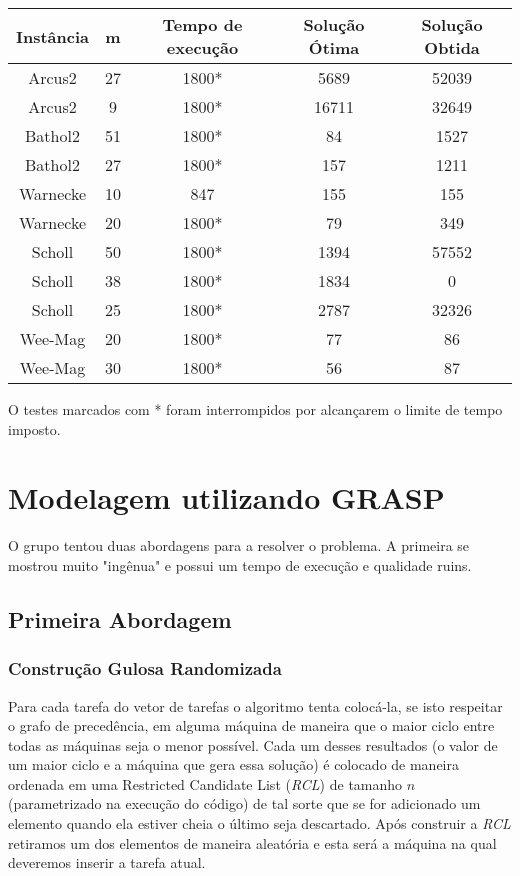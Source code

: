 \documentclass{report}
\begin{document}
\begin{table}[htbp]
 \begin{tabular}{|c|c|c|c|c|}
  \hline
  \textbf{Instância} & \textbf{m} & \textbf{Tempo de execução} & \textbf{Solução Ótima} & \textbf{Solução Obtida} \\
  \hline
  Arcus2 & 27 & 1800* & 5689  & 52039 \\
  \hline
  Arcus2 & 9 & 1800* & 16711 & 32649 \\
  \hline
  Bathol2 & 51 & 1800* & 84 & 1527 \\
  \hline
  Bathol2 & 27 & 1800* & 157 & 1211 \\
  \hline
  Warnecke & 10 & 847 & 155 & 155 \\
  \hline
  Warnecke & 20 & 1800* & 79 & 349 \\
  \hline
  Scholl & 50 & 1800* & 1394 & 57552 \\
  \hline
  Scholl & 38 & 1800* & 1834 & 0 \\
  \hline
  Scholl & 25 & 1800* & 2787 & 32326 \\
  \hline
  Wee-Mag & 20 & 1800* & 77 & 86 \\
  \hline
  Wee-Mag & 30 & 1800* & 56 & 87 \\
  \hline
 \end{tabular}
\end{table}

O testes marcados com * foram interrompidos por alcançarem o limite de tempo imposto.



\chapter{Modelagem utilizando GRASP}

O grupo tentou duas abordagens para a resolver o problema. A primeira se
mostrou muito "ingênua" e possui um tempo de execução e qualidade ruins.

\section{Primeira Abordagem}

\subsection{Construção Gulosa Randomizada}

Para cada tarefa do vetor de tarefas o algoritmo tenta colocá-la, se
isto respeitar o grafo de precedência, em alguma
máquina de maneira que o maior ciclo entre todas as máquinas
seja o menor possível. Cada um desses resultados (o valor de um maior ciclo e
a máquina que gera essa solução)
é colocado de maneira ordenada em uma Restricted Candidate List (\emph{RCL})
de tamanho $n$ (parametrizado na execução do código)
de tal sorte que se for adicionado um elemento quando ela estiver
cheia o último seja descartado. Após construir a \emph{RCL} retiramos um dos
elementos de maneira aleatória e esta será a máquina na qual deveremos inserir
a tarefa atual.
\end{document}
